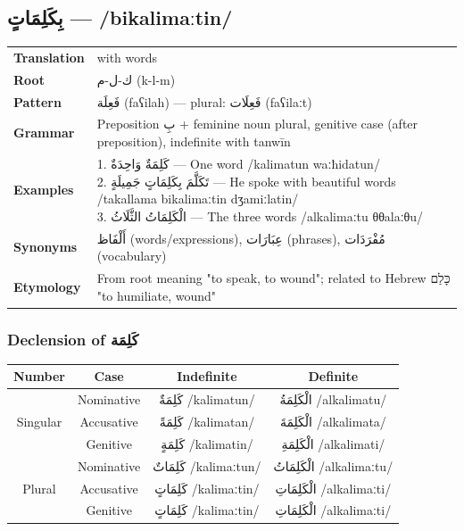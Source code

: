 \documentclass[letterpaper,12pt]{article}
\begin{document}
\subsection{\textarabic{بِكَلِمَاتٍ} — /bikalimaːtin/}
\begin{tabular}{p{3cm}p{10cm}}
\toprule
\textbf{Translation} & with words \\
\textbf{Root} & \textarabic{ك-ل-م} (k-l-m) \\
\textbf{Pattern} & \textarabic{فَعِلَة} (faʕilah) — plural: \textarabic{فَعِلَات} (faʕilaːt) \\
\textbf{Grammar} & Preposition \textarabic{بِ} + feminine noun plural, genitive case (after preposition), indefinite with tanwīn \\
\midrule
\textbf{Examples} & \makecell[l]{\parbox{9.5cm}{
1. \textarabic{كَلِمَةٌ وَاحِدَةٌ} — One word /kalimatun waːħidatun/\\
2. \textarabic{تَكَلَّمَ بِكَلِمَاتٍ جَمِيلَةٍ} — He spoke with beautiful words /takallama bikalimaːtin dʒamiːlatin/\\
3. \textarabic{الْكَلِمَاتُ الثَّلَاثُ} — The three words /alkalimaːtu θθalaːθu/
}} \\
\midrule
\textbf{Synonyms} & \textarabic{أَلْفَاظ} (words/expressions), \textarabic{عِبَارَات} (phrases), \textarabic{مُفْرَدَات} (vocabulary) \\
\textbf{Etymology} & From root meaning "to speak, to wound"; related to Hebrew \texthebrew{כָּלַם} "to humiliate, wound" \\
\bottomrule
\end{tabular}

\subsubsection*{Declension of \textarabic{كَلِمَة}}
\begin{tabular}{|c|c|c|c|}
\hline
\textbf{Number} & \textbf{Case} & \textbf{Indefinite} & \textbf{Definite} \\
\hline
\multirow{3}{*}{Singular} & Nominative & \textarabic{كَلِمَةٌ} /kalimatun/ & \textarabic{الْكَلِمَةُ} /alkalimatu/ \\
& Accusative & \textarabic{كَلِمَةً} /kalimatan/ & \textarabic{الْكَلِمَةَ} /alkalimata/ \\
& Genitive & \textarabic{كَلِمَةٍ} /kalimatin/ & \textarabic{الْكَلِمَةِ} /alkalimati/ \\
\hline
\multirow{3}{*}{Plural} & Nominative & \textarabic{كَلِمَاتٌ} /kalimaːtun/ & \textarabic{الْكَلِمَاتُ} /alkalimaːtu/ \\
& Accusative & \textarabic{كَلِمَاتٍ} /kalimaːtin/ & \textarabic{الْكَلِمَاتِ} /alkalimaːti/ \\
& Genitive & \textarabic{كَلِمَاتٍ} /kalimaːtin/ & \textarabic{الْكَلِمَاتِ} /alkalimaːti/ \\
\hline
\end{tabular}
\end{document}
